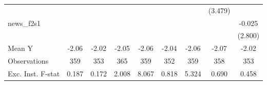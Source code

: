 {\begin{tabular}{l*{8}{c}}
            &                     &                     &                     &                     &                     &                     &     (3.479)         &                     \\
\addlinespace
news\_f2s1   &                     &                     &                     &                     &                     &                     &                     &      -0.025         \\
            &                     &                     &                     &                     &                     &                     &                     &     (2.800)         \\
\midrule
Mean Y      &       -2.06         &       -2.02         &       -2.05         &       -2.06         &       -2.04         &       -2.06         &       -2.07         &       -2.02         \\
Observations&         359         &         353         &         365         &         359         &         352         &         359         &         358         &         353         \\
Exc. Inst. F-stat&       0.187         &       0.172         &       2.008         &       8.067         &       0.818         &       5.324         &       0.690         &       0.458         \\
\bottomrule
\end{tabular}
}
